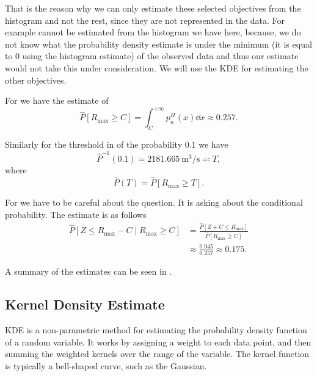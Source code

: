 That is the reason why we can only estimate these selected objectives from the histogram and not the rest, since they
are not represented in the data. For example  cannot be estimated from the histogram we have here,
because, we do not know what the probability density estimate is under the minimum (it is equal to \(0\) using 
the histogram estimate) of the observed data and thus our estimate would not take this under consideration. We
will use the \ac{KDE} for estimating the other objectives. 


For  we have the estimate of \[
    \hat{P}\left[R_{\max} \ge C\right] = \int_{C}^{+\infty} p_n^{H}(x) \dd{x} \approx 0.257.
\] 

Similarly for the threshold in  of the probability \(0.1\) we have \[
    \hat{P}^{-1}(0.1) = \qty{2181.665}{\metre\cubed\per\second} \eqqcolon T, 
\] where \[
    \hat{P}(T) = \hat{P}[ R_{\max} \ge T ].
\] 

For  we have to be careful about the question. It is asking about the conditional probability. The
estimate is as follows \[
    \begin{split}
        \hat{P}[ Z \le R_{\max} - C \mid R_{\max} \ge C ] &= \frac{\hat{P}[ Z + C \le R_{\max} ]}{\hat{P}[ R_{\max} \ge C ]}\\
                                                        &\approx \frac{0.045}{0.257} \approx 0.175.
    \end{split}
\] 

\begin{table}[h!]
    \centering
    
    \caption{Summary of the non-parametric histogram estimates for the objectives}
    \label{tab:histogram_estimates_summary}
\end{table}

A summary of the estimates can be seen in .


\subsection{Kernel Density Estimate}%
\label{sub:kernel_density_estimate}

\ac{KDE} is a non-parametric method for estimating the probability density function of a random variable. It works by assigning a weight to each data point, and then summing the weighted kernels over the range of the variable. The kernel function is typically a bell-shaped curve, such as the Gaussian.

